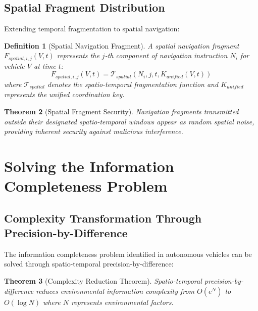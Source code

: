 \documentclass[12pt,a4paper]{article}
\newtheorem{theorem}{Theorem}[section]
\newtheorem{definition}[theorem]{Definition}
\begin{document}
\subsection{Spatial Fragment Distribution}

Extending temporal fragmentation to spatial navigation:

\begin{definition}[Spatial Navigation Fragment]
A spatial navigation fragment $F_{spatial,i,j}(V,t)$ represents the $j$-th component of navigation instruction $N_i$ for vehicle $V$ at time $t$:
\begin{equation}
F_{spatial,i,j}(V,t) = \mathcal{T}_{spatial}(N_i, j, t, K_{unified}(V,t))
\end{equation}
where $\mathcal{T}_{spatial}$ denotes the spatio-temporal fragmentation function and $K_{unified}$ represents the unified coordination key.
\end{definition}

\begin{theorem}[Spatial Fragment Security]
Navigation fragments transmitted outside their designated spatio-temporal windows appear as random spatial noise, providing inherent security against malicious interference.
\end{theorem}

\section{Solving the Information Completeness Problem}

\subsection{Complexity Transformation Through Precision-by-Difference}

The information completeness problem identified in autonomous vehicles \citep{sachikonye2025autonomous} can be solved through spatio-temporal precision-by-difference:

\begin{theorem}[Complexity Reduction Theorem]
Spatio-temporal precision-by-difference reduces environmental information complexity from $O(e^{N})$ to $O(\log N)$ where $N$ represents environmental factors.
\end{theorem}
\end{document}
